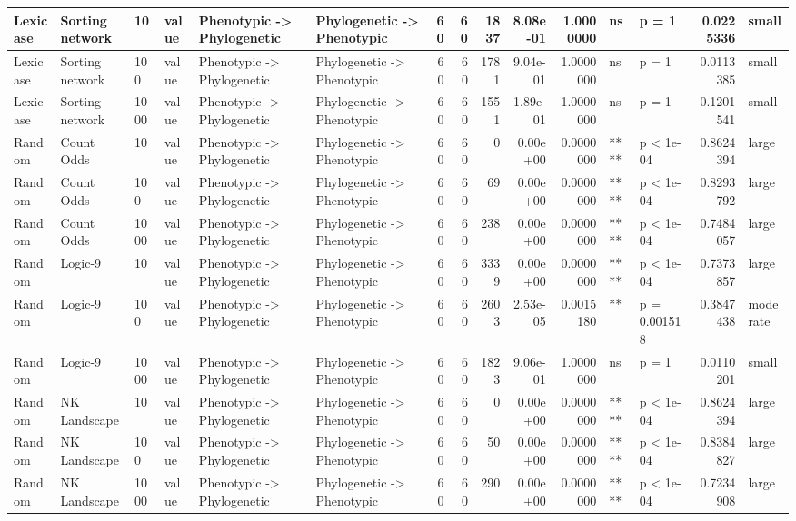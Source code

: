 \documentclass[]{book}
\begin{document}
\begin{table}
\begin{tabular}[t]{l|l|l|l|l|l|r|r|r|r|r|l|l|r|l}
\hline
Lexicase & Sorting network & 10 & value & Phenotypic
    ->
Phylogenetic & Phylogenetic
    ->
Phenotypic & 60 & 60 & 1837 & 8.08e-01 & 1.0000000 & ns & p = 1 & 0.0225336 & small\\
\hline
Lexicase & Sorting network & 100 & value & Phenotypic
    ->
Phylogenetic & Phylogenetic
    ->
Phenotypic & 60 & 60 & 1781 & 9.04e-01 & 1.0000000 & ns & p = 1 & 0.0113385 & small\\
\hline
Lexicase & Sorting network & 1000 & value & Phenotypic
    ->
Phylogenetic & Phylogenetic
    ->
Phenotypic & 60 & 60 & 1551 & 1.89e-01 & 1.0000000 & ns & p = 1 & 0.1201541 & small\\
\hline
Random & Count Odds & 10 & value & Phenotypic
    ->
Phylogenetic & Phylogenetic
    ->
Phenotypic & 60 & 60 & 0 & 0.00e+00 & 0.0000000 & **** & p < 1e-04 & 0.8624394 & large\\
\hline
Random & Count Odds & 100 & value & Phenotypic
    ->
Phylogenetic & Phylogenetic
    ->
Phenotypic & 60 & 60 & 69 & 0.00e+00 & 0.0000000 & **** & p < 1e-04 & 0.8293792 & large\\
\hline
Random & Count Odds & 1000 & value & Phenotypic
    ->
Phylogenetic & Phylogenetic
    ->
Phenotypic & 60 & 60 & 238 & 0.00e+00 & 0.0000000 & **** & p < 1e-04 & 0.7484057 & large\\
\hline
Random & Logic-9 & 10 & value & Phenotypic
    ->
Phylogenetic & Phylogenetic
    ->
Phenotypic & 60 & 60 & 3339 & 0.00e+00 & 0.0000000 & **** & p < 1e-04 & 0.7373857 & large\\
\hline
Random & Logic-9 & 100 & value & Phenotypic
    ->
Phylogenetic & Phylogenetic
    ->
Phenotypic & 60 & 60 & 2603 & 2.53e-05 & 0.0015180 & ** & p = 0.001518 & 0.3847438 & moderate\\
\hline
Random & Logic-9 & 1000 & value & Phenotypic
    ->
Phylogenetic & Phylogenetic
    ->
Phenotypic & 60 & 60 & 1823 & 9.06e-01 & 1.0000000 & ns & p = 1 & 0.0110201 & small\\
\hline
Random & NK Landscape & 10 & value & Phenotypic
    ->
Phylogenetic & Phylogenetic
    ->
Phenotypic & 60 & 60 & 0 & 0.00e+00 & 0.0000000 & **** & p < 1e-04 & 0.8624394 & large\\
\hline
Random & NK Landscape & 100 & value & Phenotypic
    ->
Phylogenetic & Phylogenetic
    ->
Phenotypic & 60 & 60 & 50 & 0.00e+00 & 0.0000000 & **** & p < 1e-04 & 0.8384827 & large\\
\hline
Random & NK Landscape & 1000 & value & Phenotypic
    ->
Phylogenetic & Phylogenetic
    ->
Phenotypic & 60 & 60 & 290 & 0.00e+00 & 0.0000000 & **** & p < 1e-04 & 0.7234908 & large\\

\end{tabular}
\end{table}
\end{document}
